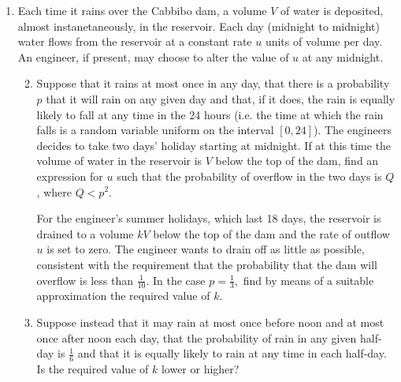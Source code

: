\documentclass[a4, 11pt]{report}
\newlength{\qspace}
\newcounter{qnumber}
\newenvironment{question}%
 {\vspace{\qspace}
  \begin{enumerate}[\bfseries 1\quad][10]%
    \setcounter{enumi}{\value{qnumber}}%
    \item%
 }
{
  \end{enumerate}
  \filbreak
  \stepcounter{qnumber}
 }
\newenvironment{questionparts}[1][1]%
 {
  \begin{enumerate}[\bfseries (i)]%
    \setcounter{enumii}{#1}
    \addtocounter{enumii}{-1}
    \setlength{\itemsep}{5mm}
    \setlength{\parskip}{8pt}
 }
 {
  \end{enumerate}
 }
\begin{document}
\begin{question}
	Each time it rains over the Cabbibo dam, a volume $V$ of water is
	deposited, almost instanetaneously, in the reservoir. Each day (midnight
	to midnight) water flows from the reservoir at a constant rate $u$
	units of volume per day. An engineer, if present, may choose to alter
	the value of $u$ at any midnight. 

	\begin{questionparts}
	\item Suppose that it rains at most once in any day, that there is a probability
	$p$ that it will rain on any given day and that, if it does, the
	rain is equally likely to fall at any time in the 24 hours (i.e. the
	time at which the rain falls is a random variable uniform on the interval
	$[0,24]$). The engineers decides to take two days' holiday starting
	at midnight. If at this time the volume of water in the reservoir
	is $V$ below the top of the dam, find an expression for $u$ such
	that the probability of overflow in the two days is $Q$, where $Q<p^{2}.$


	For the engineer's summer holidays, which last 18 days, the reservoir
	is drained to a volume $kV$ below the top of the dam and the rate
	of outflow $u$ is set to zero. The engineer wants to drain off as
	little as possible, consistent with the requirement that the probability
	that the dam will overflow is less than $\frac{1}{10}.$ In the case
	$p=\frac{1}{3},$ find by means of a suitable approximation the required
	value of $k$. 

	\item Suppose instead that it may rain at most once before noon and at most
	once after noon each day, that the probability of rain in any given
	half-day is $\frac{1}{6}$ and that it is equally likely to rain at
	any time in each half-day. Is the required value of $k$ lower or
	higher? \end{questionparts}
	\end{question}
\end{document}

